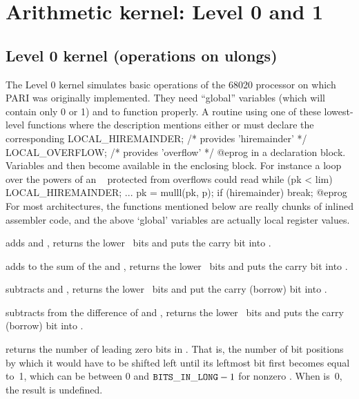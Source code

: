 \newpage
\chapter{Arithmetic kernel: Level 0 and 1}

\section{Level 0 kernel (operations on ulongs)}

The Level 0 kernel simulates basic operations of the 68020 processor on which
PARI was originally implemented. They need ``global''  variables
 (which will contain only 0 or 1) and  to
function properly. A routine using one of these lowest-level functions
where the description mentions either  or 
must declare the corresponding
\bprog
  LOCAL_HIREMAINDER;  /* provides 'hiremainder' */
  LOCAL_OVERFLOW;     /* provides 'overflow' */
@eprog\noindent
in a declaration block. Variables  and  then
become available in the enclosing block. For instance a loop over the powers
of an ~ protected from overflows could read
\bprog
 while (pk < lim)
 {
   LOCAL_HIREMAINDER;
   ...
   pk = mulll(pk, p); if (hiremainder) break;
 }
@eprog\noindent
For most architectures, the functions mentioned below are really chunks of
inlined assembler code, and the above `global' variables are actually
local register values.

 adds  and , returns the
lower \B\ bits and puts the carry bit into .

 adds  to the sum of the
 and , returns the lower \B\ bits and puts the carry bit into
.

 subtracts  and , returns
the lower \B\ bits and put the carry (borrow) bit into .

 subtracts  from the
difference of  and , returns the lower \B\ bits and puts the
carry (borrow) bit into .

 returns the number of leading zero bits in .
That is, the number of bit positions by which it would have to be shifted
left until its leftmost bit first becomes equal to~1, which can be between 0
and ${\tt BITS\_IN\_LONG}-1$ for nonzero . When  is~0, the result is undefined.

